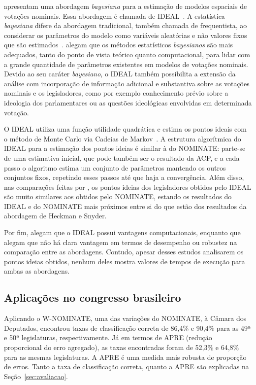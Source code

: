 \documentclass[
	article,			%
	12pt,				%
    twoside,			%
	a4paper,			%
	english,			%
	french,				%
	spanish,			%
	brazil,				%
	]{abntex2}
\newcommand\nominate{NOMINATE\xspace}
\newcommand\wnominate{W-NOMINATE\xspace}
\begin{document}
 apresentam uma abordagem \emph{bayesiana} para a estimação de modelos espaciais de votações nominais. Essa abordagem é chamada de IDEAL~\cite{carroll2009comparing}. A estatística \emph{bayesiana} difere da abordagem tradicional, também chamada de frequentista, ao considerar os parâmetros do modelo como variáveis aleatórias e não valores fixos que são estimados~\cite{gelman2003bayesian}.   alegam que os métodos estatísticos \emph{bayesianos} são mais adequados, tanto do ponto de vista teórico quanto computacional, para lidar com a grande quantidade de parâmetros existentes em modelos de votações nominais. Devido ao seu caráter \emph{bayesiano}, o IDEAL também possibilita a extensão da análise com incorporação de informação adicional e substantiva sobre as votações nominais e os legisladores, como por exemplo conhecimento prévio sobre a ideologia dos parlamentares ou as questões ideológicas envolvidas em determinada votação.

O IDEAL utiliza uma função utilidade quadrática e estima os pontos ideais com o método de Monte Carlo via Cadeias de Markov~\cite{tierney1996mcmc}. A estrutura algorítmica do IDEAL para a estimação dos pontos ideias é similar à do \nominate: parte-se de uma estimativa inicial, que pode também ser o resultado da ACP, e a cada passo o algoritmo estima um conjunto de parâmetros mantendo os outros conjuntos fixos, repetindo esses passos até que haja a convergência. Além disso, nas comparações feitas por , os pontos ideias dos legisladores obtidos pelo IDEAL são muito similares aos obtidos pelo \nominate, estando os resultados do IDEAL e do \nominate mais próximos entre si do que estão dos resultados da abordagem de Heckman e Snyder.

Por fim,  alegam que o IDEAL possui vantagens computacionais, enquanto que  alegam que não há clara vantagem em termos de desempenho ou robustez na comparação entre as abordagens. Contudo, apesar desses estudos analisarem os pontos ideias obtidos, nenhum deles mostra valores de tempos de execução para ambas as abordagens. 

\subsection{Aplicações no congresso brasileiro}

Aplicando o \wnominate, uma das variações do \nominate, à Câmara dos Deputados,  encontrou taxas de classificação correta de 86,4\% e 90,4\% para as 49ª e 50ª legislaturas, respectivamente. Já em termos de APRE (redução proporcional do erro agregado), as taxas encontradas foram de 52,3\% e 64,8\% para as mesmas legislaturas. A APRE é uma medida mais robusta de proporção de erros. Tanto a taxa de classificação correta, quanto a APRE são explicadas na Seção~\ref{sec:avaliacao}.
\end{document}

